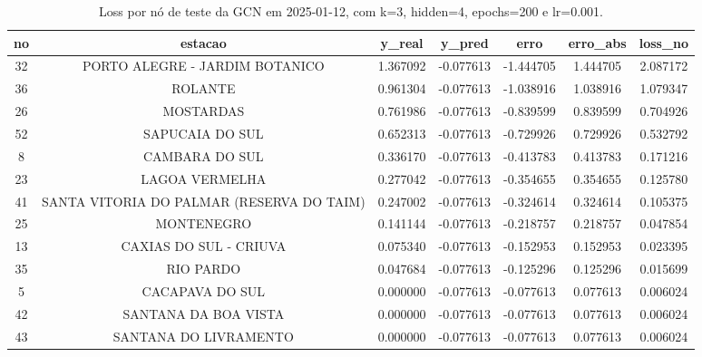 \begin{table}[h]
\centering
\caption{Loss por nó de teste da GCN em 2025-01-12, com k=3, hidden=4, epochs=200 e lr=0.001.}
\label{tab:gcn_loss_nodes_k3_hidden4}
\begin{tabular}{ccccccc}
\toprule
no & estacao & y\_real & y\_pred & erro & erro\_abs & loss\_no \\
\midrule
32 & PORTO ALEGRE - JARDIM BOTANICO & 1.367092 & -0.077613 & -1.444705 & 1.444705 & 2.087172 \\
36 & ROLANTE & 0.961304 & -0.077613 & -1.038916 & 1.038916 & 1.079347 \\
26 & MOSTARDAS & 0.761986 & -0.077613 & -0.839599 & 0.839599 & 0.704926 \\
52 & SAPUCAIA DO SUL & 0.652313 & -0.077613 & -0.729926 & 0.729926 & 0.532792 \\
8 & CAMBARA DO SUL & 0.336170 & -0.077613 & -0.413783 & 0.413783 & 0.171216 \\
23 & LAGOA VERMELHA & 0.277042 & -0.077613 & -0.354655 & 0.354655 & 0.125780 \\
41 & SANTA VITORIA DO PALMAR (RESERVA DO TAIM) & 0.247002 & -0.077613 & -0.324614 & 0.324614 & 0.105375 \\
25 & MONTENEGRO & 0.141144 & -0.077613 & -0.218757 & 0.218757 & 0.047854 \\
13 & CAXIAS DO SUL - CRIUVA & 0.075340 & -0.077613 & -0.152953 & 0.152953 & 0.023395 \\
35 & RIO PARDO & 0.047684 & -0.077613 & -0.125296 & 0.125296 & 0.015699 \\
5 & CACAPAVA DO SUL & 0.000000 & -0.077613 & -0.077613 & 0.077613 & 0.006024 \\
42 & SANTANA DA BOA VISTA & 0.000000 & -0.077613 & -0.077613 & 0.077613 & 0.006024 \\
43 & SANTANA DO LIVRAMENTO & 0.000000 & -0.077613 & -0.077613 & 0.077613 & 0.006024 \\
\bottomrule
\end{tabular}
\end{table}

